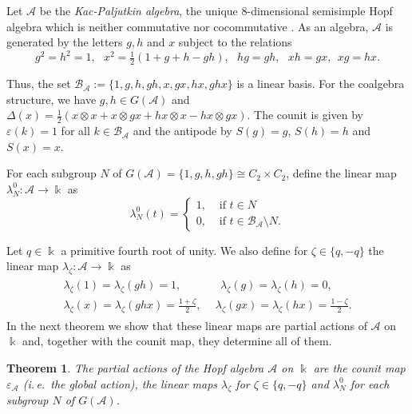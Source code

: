 \documentclass[reqno]{amsart}
\newtheorem{thm}{Theorem}[section]
\theoremstyle{definition}
\numberwithin{equation}{section}\theoremstyle{plain}
\newcommand{\B}{\mathcal{B}}
\theoremstyle{definition}
\def \k {\Bbbk}
\def \A {\mathcal{A}}
\begin{document}
 Let $\A$ be the \emph{Kac-Paljutkin algebra}, the unique 8-dimensional semisimple Hopf algebra which is neither commutative nor cocommutative \cite{masuoka}.
As an algebra, \(\A\) is generated by the letters $g, h$ and $x$ subject to the relations
$$g^2=h^2=1, \ \ \ x^2=\tfrac{1}{2}\left(1+g+h-gh\right), \ \ \ hg=gh, \ \ \ xh=gx, \ \ xg=hx.$$

Thus, the set $\B_\A :=\{1,g,h,gh,x,gx,hx,ghx\}$ is a linear basis.
For the coalgebra structure, we have $g, h \in G(\A)$ and $\Delta(x) = 
\tfrac{1}{2}(x\otimes x+x\otimes gx+hx\otimes x-hx\otimes gx)$.
The counit is given by $\varepsilon(k)=1$ for all $k\in \B_\A$ and the antipode by \(S(g) = g\), \(S(h) = h\) and \(S(x) = x\).

\medbreak

For each subgroup $N$ of $G(\mathcal{A})= \{1, g, h, gh \} \cong C_2 \times C_2$, define the linear map $\lambda_N^0: \A \to \Bbbk$ as 
\begin{equation*}
    \lambda_N^0 (t) = \begin{cases}
	1, & \textrm{ if } t \in N \\ 0, & \textrm{ if  } t \in \B_\mathcal{A} \setminus N. \end{cases}
\end{equation*}

Let \(q \in \Bbbk\) a primitive fourth root of unity. 
We also define for $\zeta \in \{ q, -q \}$ the linear map $\lambda_\zeta : \A \to \Bbbk$ as 
\begin{align}\label{lda_zeta}
\begin{split}
\lambda_\zeta(1) = \lambda_\zeta(gh)  = 1 , &  \  \ \ \ 
\lambda_\zeta(g) = \lambda_\zeta(h)  = 0, \\
\lambda_\zeta(x) = \lambda_\zeta(ghx)  = \tfrac{1+\zeta}{2}, & \ \
\lambda_\zeta(gx) = \lambda_\zeta(hx)   = \tfrac{1-\zeta}{2}.
\end{split}
\end{align} 
In the next theorem we show that these linear maps are partial actions of $\mathcal{A}$ on $\Bbbk$ and, together with the counit map, they determine all of them.


\begin{thm}\label{acoes_parciais_A}
    The partial actions of the Hopf algebra \(\A\) on \(\k\) are the counit map \( \varepsilon_\A\) (i.\,e.\ the global action), the linear maps $\lambda_\zeta$ for $ \zeta \in \{q, -q \}$ and $\lambda_N^0$ for each subgroup $N$ of $G(\A)$.
\end{thm}
\end{document}
